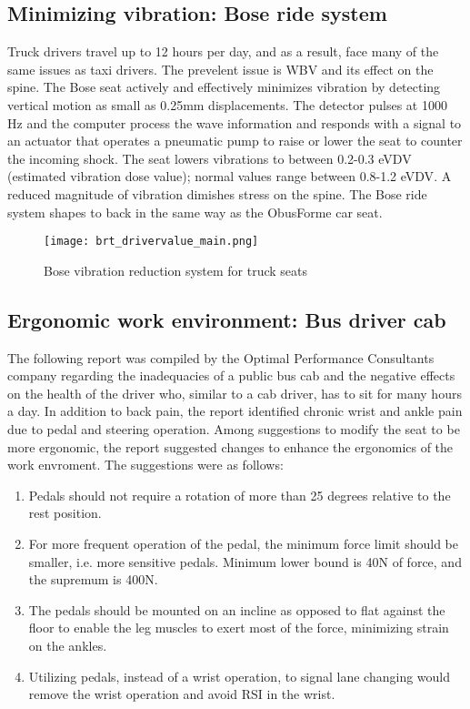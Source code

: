 \documentclass[11pt]{article}
\begin{document}
\subsection{Minimizing vibration: Bose ride system}
Truck drivers travel up to 12 hours per day, and as a result, face many of the same issues as taxi drivers. 
The prevelent issue is WBV and its effect on the spine. The Bose seat actively and effectively minimizes vibration 
by detecting vertical motion as small as 0.25mm displacements. %
The detector pulses at 1000 Hz and the computer process the 
wave information and responds with a signal to an actuator that operates a pneumatic pump to raise or lower the seat to 
counter the incoming shock. The seat lowers vibrations to between 0.2-0.3 eVDV (estimated vibration dose value); normal values range 
between 0.8-1.2 eVDV\cite{Bosetruckseat}. A reduced magnitude of vibration dimishes stress on the spine. The Bose ride system shapes to back in the same way as the 
ObusForme car seat\cite{Bosetruckseat}.
\begin{figure}[h]
  \centering
  \texttt{[image: brt\_drivervalue\_main.png]}
  \caption{Bose vibration reduction system for truck seats}
\end{figure}
\subsection{Ergonomic work environment: Bus driver cab}
The following report was compiled by the Optimal Performance Consultants company regarding the 
inadequacies of a public bus cab and the negative effects on the health of the driver who, similar to a cab driver, has to sit 
for many hours a day\cite{Ismail2003}. In addition to back pain, the report 
identified chronic wrist and ankle pain due to pedal and steering operation. Among suggestions to modify the 
seat to be more ergonomic, the report suggested changes to enhance the ergonomics of the work envroment. 
The suggestions were as follows:
\begin{enumerate}
\item Pedals should not require a rotation of more than 25 degrees relative to the rest position. 
\item For more frequent operation of the pedal, the minimum force limit should be smaller, 
i.e. more sensitive pedals. Minimum lower bound is 40N of force, and the supremum is 400N.
\item The pedals should be mounted on an incline as opposed to flat against the floor to enable the leg 
muscles to exert most of the force, minimizing strain on the ankles. 
\item Utilizing pedals, instead of a wrist operation, to signal lane changing would remove the wrist operation
and avoid RSI in the wrist.
\end{enumerate}
\end{document}
